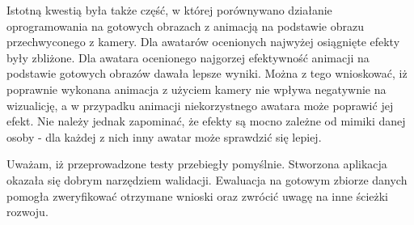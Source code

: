 Istotną kwestią była także część, w której porównywano działanie oprogramowania na gotowych obrazach z animacją na podstawie obrazu przechwyconego z kamery. Dla awatarów ocenionych najwyżej osiągnięte efekty były zbliżone. Dla awatara ocenionego najgorzej efektywność animacji na podstawie gotowych obrazów dawała lepsze wyniki. Można z tego wnioskować, iż poprawnie wykonana animacja z użyciem kamery nie wpływa negatywnie na wizualicję, a w przypadku animacji niekorzystnego awatara może poprawić jej efekt. Nie należy jednak zapominać, że efekty są mocno zależne od mimiki danej osoby - dla każdej z nich inny awatar może sprawdzić się lepiej. 

Uważam, iż przeprowadzone testy przebiegły pomyślnie. Stworzona aplikacja okazała się dobrym narzędziem walidacji. Ewaluacja na gotowym zbiorze danych pomogła zweryfikować otrzymane wnioski oraz zwrócić uwagę na inne ścieżki rozwoju.




